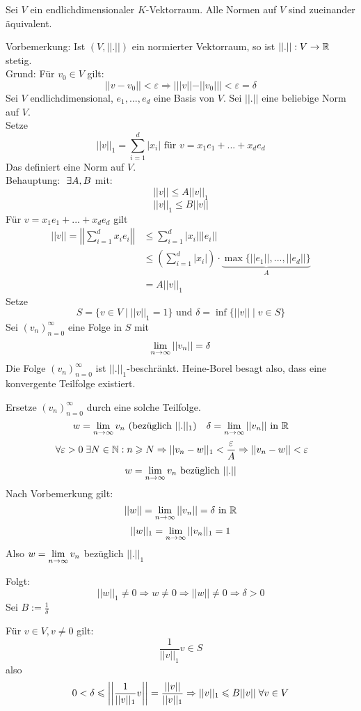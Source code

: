 \documentclass[main.tex]{subfiles}
\begin{document}
\begin{Theorem}
  Sei $V$ ein endlichdimensionaler $K$-Vektorraum. Alle Normen auf $V$ sind zueinander äquivalent.
\end{Theorem}

\begin{Beweis}
  Vorbemerkung: Ist $(V,||.||)$ ein normierter Vektorraum, so ist $||.||:V \to \mathbb{R}$ stetig.\\
  Grund: Für $v_0 \in V$ gilt:
  $$||v-v_0|| < \varepsilon \Rightarrow | ||v||-||v_0||| < \varepsilon = \delta$$
  Sei $V$ endlichdimensional, $e_1,..., e_d$ eine Basis von $V$. Sei $||.||$ eine beliebige Norm auf $V$.\\
  Setze
  $$||v||_1 = \sum \limits_{i=1}^d|x_i| \text{ für } v = x_1 e_1 + ... + x_d e_d$$
  Das definiert eine Norm auf $V$.\\
  Behauptung: $\;\exists A,B$ mit:
  $$||v|| \leq A ||v||_1$$
  $$||v||_1 \leq B ||v||$$
  Für $v = x_1 e_1 + ... + x_d e_d$ gilt
  $$\begin{aligned}
    ||v|| = \left|\left| \sum \limits_{i=1}^d x_i e_i \right|\right| &\leq \sum \limits_{i=1}^d |x_i| ||e_i||\\
    &\leq \left( \sum \limits_{i=1}^d |x_i|\right) \cdot \underbrace{\max\{||e_1||,...,||e_d||\}}_{A}\\
    &= A ||v||_1
  \end{aligned}$$
  Setze $$S = \{v \in V \mid ||v||_1 = 1\} \text{ und } \delta = \inf\{||v|| \mid v \in S\}$$
  Sei $(v_n)_{n=0}^\infty$ eine Folge in $S$ mit
  $$\lim \limits_{n \to \infty} ||v_n|| = \delta$$
  Die Folge $(v_n)_{n=0}^\infty$ ist $||.||_1$-beschränkt. Heine-Borel besagt also, dass eine konvergente Teilfolge existiert.

  Ersetze $(v_n)_{n=0}^\infty$ durch eine solche Teilfolge.
  $$w = \lim \limits_{n \to \infty} v_n \text{ (bezüglich $||.||_1$)} \quad \delta = \lim \limits_{n \to \infty} ||v_n|| \text{ in } \mathbb{R}$$
  $$\;\forall \varepsilon > 0 \;\exists N \in \mathbb{N} : n \geqslant N \Rightarrow ||v_n - w||_1 < \dfrac{\varepsilon}{A} \Rightarrow ||v_n - w|| < \varepsilon$$
  $$w = \lim \limits_{n \to \infty} v_n \text{ bezüglich } ||.||$$
  Nach Vorbemerkung gilt:
  $$||w|| = \lim \limits_{n \to \infty} ||v_n|| = \delta \text{ in } \mathbb{R}$$
  $$||w||_1 = \lim \limits_{n \to \infty} ||v_n||_1 = 1$$
  Also $w = \lim \limits_{n \to \infty} v_n$ bezüglich $||.||_1$

  Folgt:
  $$||w||_1 \neq 0 \Rightarrow w \neq 0 \Rightarrow ||w|| \neq 0 \Rightarrow \delta > 0$$
  Sei $B := \frac{1}{\delta}$

  Für $v\in V, v\neq 0$ gilt:
  $$\dfrac{1}{||v||_1} v \in S$$
  also
  $$0 < \delta \leqslant \left|\left| \dfrac{1}{||v||_1} v \right|\right| = \dfrac{||v||}{||v||_1} \Rightarrow ||v||_1 \leqslant B ||v|| \;\forall v \in V$$
\end{Beweis}
\end{document}
